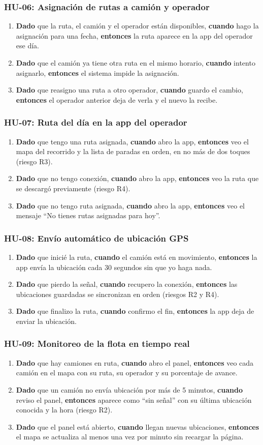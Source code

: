 \documentclass[11pt,a4paper]{article}
\newcommand{\dce}[3]{\textbf{Dado} #1, \textbf{cuando} #2, \textbf{entonces} #3}
\newcommand{\criterios}[1]{\subsubsection*{#1}}
\begin{document}
\criterios{HU-06: Asignación de rutas a camión y operador}
\begin{enumerate}
  \item \dce{que la ruta, el camión y el operador están disponibles}{hago la asignación para una fecha}{la ruta aparece en la app del operador ese día.}
  \item \dce{que el camión ya tiene otra ruta en el mismo horario}{intento asignarlo}{el sistema impide la asignación.}
  \item \dce{que reasigno una ruta a otro operador}{guardo el cambio}{el operador anterior deja de verla y el nuevo la recibe.}
\end{enumerate}

\criterios{HU-07: Ruta del día en la app del operador}
\begin{enumerate}
  \item \dce{que tengo una ruta asignada}{abro la app}{veo el mapa del recorrido y la lista de paradas en orden, en no más de dos toques (riesgo R3).}
  \item \dce{que no tengo conexión}{abro la app}{veo la ruta que se descargó previamente (riesgo R4).}
  \item \dce{que no tengo ruta asignada}{abro la app}{veo el mensaje ``No tienes rutas asignadas para hoy''.}
\end{enumerate}

\criterios{HU-08: Envío automático de ubicación GPS}
\begin{enumerate}
  \item \dce{que inicié la ruta}{el camión está en movimiento}{la app envía la ubicación cada 30 segundos sin que yo haga nada.}
  \item \dce{que pierdo la señal}{recupero la conexión}{las ubicaciones guardadas se sincronizan en orden (riesgos R2 y R4).}
  \item \dce{que finalizo la ruta}{confirmo el fin}{la app deja de enviar la ubicación.}
\end{enumerate}

\criterios{HU-09: Monitoreo de la flota en tiempo real}
\begin{enumerate}
  \item \dce{que hay camiones en ruta}{abro el panel}{veo cada camión en el mapa con su ruta, su operador y su porcentaje de avance.}
  \item \dce{que un camión no envía ubicación por más de 5 minutos}{reviso el panel}{aparece como ``sin señal'' con su última ubicación conocida y la hora (riesgo R2).}
  \item \dce{que el panel está abierto}{llegan nuevas ubicaciones}{el mapa se actualiza al menos una vez por minuto sin recargar la página.}
\end{enumerate}
\end{document}
